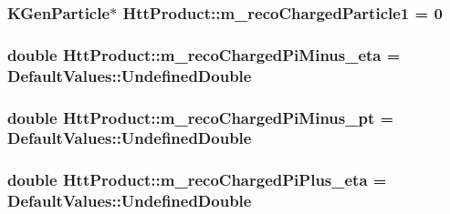 \label{classHttProduct_ade299bec9d6dd15b181cd562ec28cd3b}
\hypertarget{classHttProduct_ab6e20142aa603f129f8beb7935997aca}{
\subsubsection[{m\_\-recoChargedParticle1}]{\setlength{\rightskip}{0pt plus 5cm}KGenParticle$\ast$ {\bf HttProduct::m\_\-recoChargedParticle1} = 0}}
\label{classHttProduct_ab6e20142aa603f129f8beb7935997aca}
\hypertarget{classHttProduct_a86d235473b682dc25e69a6fde2c91fa7}{
\subsubsection[{m\_\-recoChargedPiMinus\_\-eta}]{\setlength{\rightskip}{0pt plus 5cm}double {\bf HttProduct::m\_\-recoChargedPiMinus\_\-eta} = DefaultValues::UndefinedDouble}}
\label{classHttProduct_a86d235473b682dc25e69a6fde2c91fa7}
\hypertarget{classHttProduct_a08d03c554a680c0d4009618907a50a5e}{
\subsubsection[{m\_\-recoChargedPiMinus\_\-pt}]{\setlength{\rightskip}{0pt plus 5cm}double {\bf HttProduct::m\_\-recoChargedPiMinus\_\-pt} = DefaultValues::UndefinedDouble}}
\label{classHttProduct_a08d03c554a680c0d4009618907a50a5e}
\hypertarget{classHttProduct_a904bf8957cc303f9c257259d898675e8}{
\subsubsection[{m\_\-recoChargedPiPlus\_\-eta}]{\setlength{\rightskip}{0pt plus 5cm}double {\bf HttProduct::m\_\-recoChargedPiPlus\_\-eta} = DefaultValues::UndefinedDouble}}
\label{classHttProduct_a904bf8957cc303f9c257259d898675e8}
